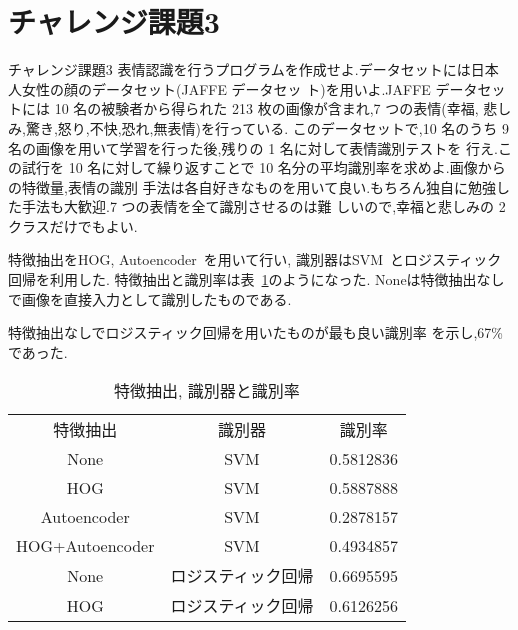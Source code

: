 \section{チャレンジ課題3}\label{section:challenge3}
\begin{itembox}{チャレンジ課題3}
  表情認識を行うプログラムを作成せよ.データセットには日本人女性の顔のデータセット(JAFFE データセッ ト)を用いよ.JAFFE データセットには 10 名の被験者から得られた 213 枚の画像が含まれ,7 つの表情(幸福, 悲しみ,驚き,怒り,不快,恐れ,無表情)を行っている.
  このデータセットで,10 名のうち 9 名の画像を用いて学習を行った後,残りの 1 名に対して表情識別テストを 行え.この試行を 10 名に対して繰り返すことで 10 名分の平均識別率を求めよ.画像からの特徴量,表情の識別 手法は各自好きなものを用いて良い.もちろん独自に勉強した手法も大歓迎.7 つの表情を全て識別させるのは難 しいので,幸福と悲しみの 2 クラスだけでもよい.
\end{itembox}

特徴抽出をHOG, Autoencoder~\cite{autoencoder}を用いて行い,
識別器はSVM~\cite{sklearn-svm}とロジスティック回帰を利用した.
特徴抽出と識別率は表~\ref{tbl:feature-extraction-score}のようになった.
Noneは特徴抽出なしで画像を直接入力として識別したものである.

特徴抽出なしでロジスティック回帰を用いたものが最も良い識別率
を示し,67\%であった.

\begin{table}[htbp]
  \begin{center}
    \begin{tabular}{ccc}
      特徴抽出 & 識別器 & 識別率 \\
      None & SVM & 0.5812836 \\
      HOG & SVM & 0.5887888  \\
      Autoencoder & SVM & 0.2878157 \\
      HOG+Autoencoder & SVM & 0.4934857  \\
      None & ロジスティック回帰 & 0.6695595 \\
      HOG & ロジスティック回帰 & 0.6126256 \\
    \end{tabular}
    \caption{特徴抽出, 識別器と識別率}
    \label{tbl:feature-extraction-score}
  \end{center}
\end{table}

